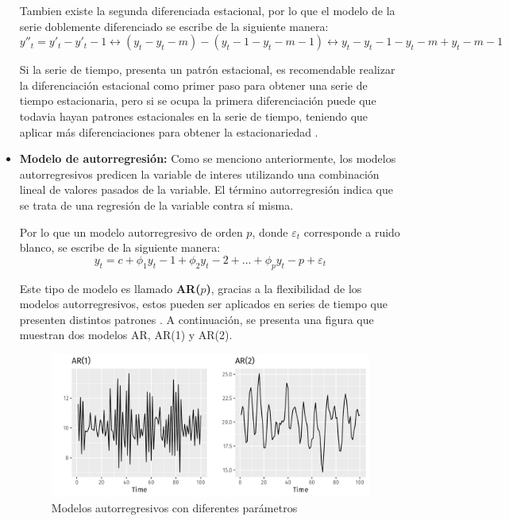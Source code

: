 \begin{itemize}
    Tambien existe la segunda diferenciada estacional, por lo que el modelo de la serie doblemente diferenciado se escribe de la siguiente manera:
    \begin{equation*}
        y''_t=y'_t-y'_t-1 \leftrightarrow (y_t-y_t-m)-(y_t-1-y_t-m-1) \leftrightarrow y_t-y_t-1-y_t-m+y_t-m-1
    \end{equation*}

    Si la serie de tiempo, presenta un patrón estacional, es recomendable realizar la diferenciación estacional como primer paso para obtener una serie de tiempo estacionaria, pero si se ocupa la primera diferenciación puede que todavia hayan patrones estacionales en la serie de tiempo, teniendo que aplicar más diferenciaciones para obtener la estacionariedad \cite{forecast-time-series-arima}.

    \item \textbf{Modelo de autorregresión:} Como se menciono anteriormente, los modelos autorregresivos predicen la variable de interes utilizando una combinación lineal de valores pasados de la variable. El término autorregresión indica que se trata de una regresión de la variable contra sí misma.
    
    Por lo que un modelo autorregresivo de orden $p$, donde $\varepsilon_t$ corresponde a ruido blanco, se escribe de la siguiente manera:
    \begin{equation*}
        y_t=c+\phi_1y_t-1+\phi_2y_t-2+...+\phi_py_t-p+\varepsilon_t
    \end{equation*}

    Este tipo de modelo es llamado \textbf{AR($p$)}, gracias a la flexibilidad de los modelos autorregresivos, estos pueden ser aplicados en series de tiempo que presenten distintos patrones \cite{forecast-time-series-arima}. A continuación, se presenta una figura que muestran dos modelos AR, AR(1) y AR(2).

    \begin{figure}[H]
        \begin{minipage}[t]{0.9\textwidth}
            \caption{Modelos autorregresivos con diferentes parámetros}
            \label{ARmodel}        
        \end{minipage}
    
        \vspace{10pt}
    
        \begin{minipage}[b]{1.1\textwidth}
            \centering
            \includegraphics[width=\textwidth]{img/arp-1-example.png}        
        \end{minipage}
    

\end{figure}
\end{itemize}
